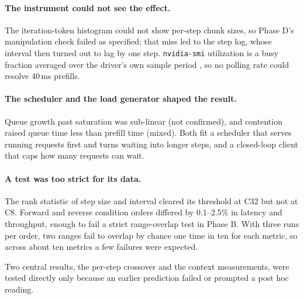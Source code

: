 \paragraph{The instrument could not see the effect.}
The iteration-token histogram could not show per-step chunk sizes, so Phase D's
manipulation check failed as specified; that miss led to the step log, whose interval
then turned out to lag by one step. \texttt{nvidia-smi} utilization is a busy fraction
averaged over the driver's own sample period \citep{nvidiasmi}, so no polling rate
could resolve 40\,ms prefills.

\paragraph{The scheduler and the load generator shaped the result.}
Queue growth past saturation was sub-linear (not confirmed), and contention raised
queue time less than prefill time (mixed). Both fit a scheduler that serves running
requests first and turns waiting into longer steps, and a closed-loop client that caps
how many requests can wait.

\paragraph{A test was too strict for its data.}
The rank statistic of step size and interval cleared its threshold at C32 but not at
C8. Forward and reverse condition orders differed by 0.1--2.5\% in latency and
throughput, enough to fail a strict range-overlap test in Phase B. With three runs per
order, two ranges fail to overlap by chance one time in ten for each metric, so across
about ten metrics a few failures were expected.

Two central results, the per-step crossover and the context measurements, were tested
directly only because an earlier prediction failed or prompted a post hoc reading.
